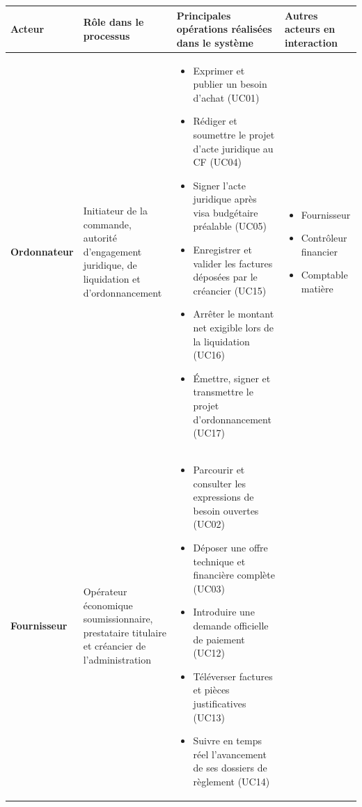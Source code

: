 \documentclass[11pt,a4paper]{article}
\begin{document}
\vspace{0.2cm}
\begin{center}
\scriptsize
\renewcommand{\arraystretch}{1.12}
\begin{tabularx}{\linewidth}{L{2.4cm} L{3.1cm} Y L{2.7cm}}
\toprule
\textbf{\sffamily Acteur} &
\textbf{\sffamily Rôle dans le processus} &
\textbf{\sffamily Principales opérations réalisées dans le système} &
\textbf{\sffamily Autres acteurs en interaction} \\
\midrule
{}
\textbf{Ordonnateur} &
Initiateur de la commande, autorité d'engagement juridique, de liquidation et d'ordonnancement &
\begin{itemize}[leftmargin=1.0em, nosep]
  \item Exprimer et publier un besoin d'achat (UC01)
  \item Rédiger et soumettre le projet d'acte juridique au CF (UC04)
  \item Signer l'acte juridique après visa budgétaire préalable (UC05)
  \item Enregistrer et valider les factures déposées par le créancier (UC15)
  \item Arrêter le montant net exigible lors de la liquidation (UC16)
  \item Émettre, signer et transmettre le projet d'ordonnancement (UC17)
\end{itemize} &
\begin{itemize}[leftmargin=1.0em, nosep]
  \item Fournisseur
  \item Contrôleur financier
  \item Comptable matière
\end{itemize} \\
\midrule
\textbf{Fournisseur} &
Opérateur économique soumissionnaire, prestataire titulaire et créancier de l'administration &
\begin{itemize}[leftmargin=1.0em, nosep]
  \item Parcourir et consulter les expressions de besoin ouvertes (UC02)
  \item Déposer une offre technique et financière complète (UC03)
  \item Introduire une demande officielle de paiement (UC12)
  \item Téléverser factures et pièces justificatives (UC13)
  \item Suivre en temps réel l'avancement de ses dossiers de règlement (UC14)
\end{itemize} &

\end{tabularx}
\end{center}
\end{document}
